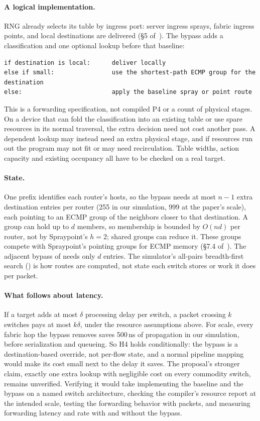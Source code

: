\paragraph{A logical implementation.} RNG already selects its table by ingress port: server ingress sprays, fabric ingress points, and local destinations are delivered (§5 of~\cite{rng}). The bypass adds a classification and one optional lookup before that baseline:
\begin{verbatim}
if destination is local:      deliver locally
else if small:                use the shortest-path ECMP group for the destination
else:                         apply the baseline spray or point route
\end{verbatim}
This is a forwarding specification, not compiled P4 or a count of physical stages. On a device that can fold the classification into an existing table or use spare resources in its normal traversal, the extra decision need not cost another pass. A dependent lookup may instead need an extra physical stage, and if resources run out the program may not fit or may need recirculation. Table widths, action capacity and existing occupancy all have to be checked on a real target.

\paragraph{State.} One prefix identifies each router's hosts, so the bypass needs at most $n - 1$ extra destination entries per router (255 in our simulation, 999 at the paper's scale), each pointing to an ECMP group of the neighbors closer to that destination. A group can hold up to $d$ members, so membership is bounded by $O(nd)$ per router, not by Spraypoint's $h = 2$; shared groups can reduce it. These groups compete with Spraypoint's pointing groups for ECMP memory (§7.4 of~\cite{rng}). The adjacent bypass of  needs only $d$ entries. The simulator's all-pairs breadth-first search () is how routes are computed, not state each switch stores or work it does per packet.

\paragraph{What follows about latency.} If a target adds at most $\delta$ processing delay per switch, a packet crossing $k$ switches pays at most $k\delta$, under the resource assumptions above. For scale, every fabric hop the bypass removes saves 500\,ns of propagation in our simulation, before serialization and queueing. So H4 holds conditionally: the bypass is a destination-based override, not per-flow state, and a normal pipeline mapping would make its cost small next to the delay it saves. The proposal's stronger claim, exactly one extra lookup with negligible cost on every commodity switch, remains unverified. Verifying it would take implementing the baseline and the bypass on a named switch architecture, checking the compiler's resource report at the intended scale, testing the forwarding behavior with packets, and measuring forwarding latency and rate with and without the bypass.
